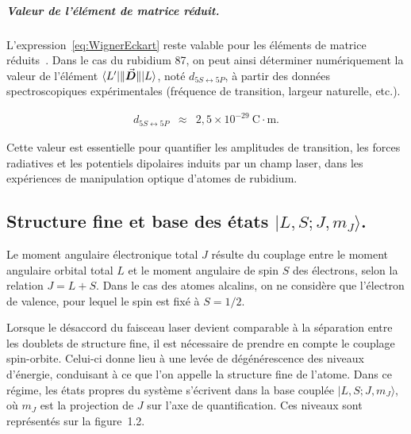 \subparagraph{Valeur de l’élément de matrice réduit.}

L'expression~\eqref{eq:WignerEckart} reste valable pour les éléments de matrice réduits~\cite{CCT_QO}. Dans le cas du rubidium 87, on peut ainsi déterminer numériquement la valeur de l’élément $\bra{L'}\!\|\vec{{\bm{D}}}\|\!\ket{L}$, noté $d_{\scriptstyle 5S \leftrightarrow 5P}$, à partir des données spectroscopiques expérimentales (fréquence de transition, largeur naturelle, etc.).

\begin{eqnarray}
d_{\scriptstyle 5S \leftrightarrow 5P} &\approx& 2{,}5 \times 10^{-29}~\mathrm{C \cdot m}.
\end{eqnarray}

Cette valeur est essentielle pour quantifier les amplitudes de transition, les forces radiatives et les potentiels dipolaires induits par un champ laser, dans les expériences de manipulation optique d’atomes de rubidium.



\subsection{Structure fine et base des états $|L, S; J, m_J\rangle$.}

Le moment angulaire électronique total $J$ résulte du couplage entre le moment angulaire orbital total $L$ et le moment angulaire de spin $S$ des électrons, selon la relation $J = L + S$. Dans le cas des atomes alcalins, on ne considère que l’électron de valence, pour lequel le spin est fixé à $S = 1/2$.

Lorsque le désaccord du faisceau laser devient comparable à la séparation entre les doublets de structure fine, il est nécessaire de prendre en compte le couplage spin-orbite. Celui-ci donne lieu à une levée de dégénérescence des niveaux d’énergie, conduisant à ce que l’on appelle la structure fine de l’atome. Dans ce régime, les états propres du système s’écrivent dans la base couplée $|L, S; J, m_J\rangle$, où $m_J$ est la projection de $J$ sur l’axe de quantification. Ces niveaux sont représentés sur la figure~1.2.


